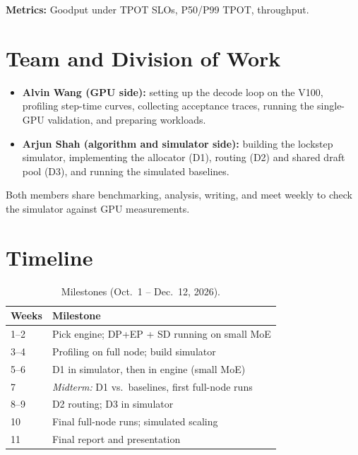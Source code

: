 \documentclass{article}
\begin{document}
\textbf{Metrics:} Goodput under TPOT SLOs, P50/P99 TPOT, throughput.

\section{Team and Division of Work}
\label{sec:team}

\begin{itemize}
\item \textbf{Alvin Wang (GPU side):} setting up the decode loop on the V100,
profiling step-time curves, collecting acceptance traces, running the
single-GPU validation, and preparing workloads.
\item \textbf{Arjun Shah (algorithm and simulator side):} building the lockstep
simulator, implementing the allocator (D1), routing (D2) and shared draft
pool (D3), and running the simulated baselines.
\end{itemize}
Both members share benchmarking, analysis, writing, and meet weekly to
check the simulator against GPU measurements.


\section{Timeline}
\label{sec:timeline}

\begin{table}[h]
\caption{Milestones (Oct.\ 1 -- Dec.\ 12, 2026).}
\label{tab:timeline}
\vskip 0.1in
\begin{center}
\begin{footnotesize}
\setlength{\tabcolsep}{4pt}
\begin{tabular}{ll}
\toprule
Weeks & Milestone \\
\midrule
1--2 & Pick engine; DP+EP + SD running on small MoE \\
3--4 & Profiling on full node; build simulator \\
5--6 & D1 in simulator, then in engine (small MoE) \\
7 & \emph{Midterm:} D1 vs.\ baselines, first full-node runs \\
8--9 & D2 routing; D3 in simulator \\
10 & Final full-node runs; simulated scaling \\
11 & Final report and presentation \\
\bottomrule
\end{tabular}
\end{footnotesize}
\end{center}
\vskip -0.15in
\end{table}
\end{document}
